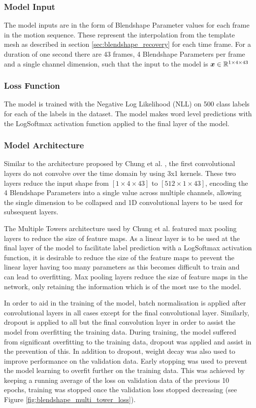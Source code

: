 \subsubsection{Model Input} \label{sec:classification_inputs}
The model inputs are in the form of Blendshape Parameter values for each frame in the motion sequence.
These represent the interpolation from the template mesh as described in section \ref{sec:blendshape_recovery} for each time frame.
For a duration of one second there are 43 frames, 4 Blendshape Parameters per frame and a single channel dimension, such that the input to the model is ${\boldsymbol{{x}}} \in \mathbb{R}^{1 \times 4 \times 43}$

\subsubsection{Loss Function}
The model is trained with the Negative Log Likelihood (NLL) on 500 class labels for each of the labels in the dataset.
The model makes word level predictions with the LogSoftmax activation function applied to the final layer of the model.

\subsubsection{Model Architecture} \label{sec:classification_model_arch}
Similar to the architecture proposed by Chung et al. \cite{Chung2016}, the first convolutional layers do not convolve over the time domain by using 3x1 kernels.
These two layers reduce the input shape from $[1 \times 4 \times 43]$ to $[512 \times 1 \times 43]$, encoding the 4 Blendshape Parameters into a single value across multiple channels, allowing the single dimension to be collapsed and 1D convolutional layers to be used for subsequent layers.

The Multiple Towers architecture used by Chung et al. featured max pooling layers to reduce the size of feature maps.
As a linear layer is to be used at the final layer of the model to facilitate label prediction with a LogSoftmax activation function, it is desirable to reduce the size of the feature maps to prevent the linear layer having too many parameters as this becomes difficult to train and can lead to overfitting.
Max pooling layers reduce the size of feature maps in the network, only retaining the information which is of the most use to the model.

In order to aid in the training of the model, batch normalisation is applied after convolutional layers in all cases except for the final convolutional layer.
Similarly, dropout is applied to all but the final convolution layer in order to assist the model from overfitting the training data.
During training, the model suffered from significant overfitting to the training data, dropout was applied and assist in the prevention of this.
In addition to dropout, weight decay was also used to improve performance on the validation data.
Early stopping was used to prevent the model learning to overfit further on the training data.
This was achieved by keeping a running average of the loss on validation data of the previous 10 epochs, training was stopped once the validation loss stopped decreasing (see Figure \ref{fig:blendshape_multi_tower_loss}).

